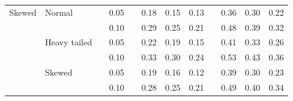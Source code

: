 \documentclass[12pt]{article} %
\begin{document}
\begin{table}[ht]
\begin{scriptsize}
\begin{center}
\begin{tabular}{ll p{.1cm} c p{.1cm} rrr p{.1cm} rrr}
Skewed       & Normal       && 0.05 &&  0.18 & 0.15 & 0.13 && 0.36 & 0.30 & 0.22 \\ 
             &              && 0.10 &&  0.29 & 0.25 & 0.21 && 0.48 & 0.39 & 0.32 \\ 
             & Heavy tailed && 0.05 &&  0.22 & 0.19 & 0.15 && 0.41 & 0.33 & 0.26 \\ 
             &              && 0.10 &&  0.33 & 0.30 & 0.24 && 0.53 & 0.43 & 0.36 \\ 
             & Skewed       && 0.05 &&  0.19 & 0.16 & 0.12 && 0.39 & 0.30 & 0.23 \\ 
             &              && 0.10 &&  0.28 & 0.25 & 0.21 && 0.49 & 0.40 & 0.34 \\

\hline
\end{tabular}
\end{center}
\end{scriptsize}
\end{table}
\end{document}
